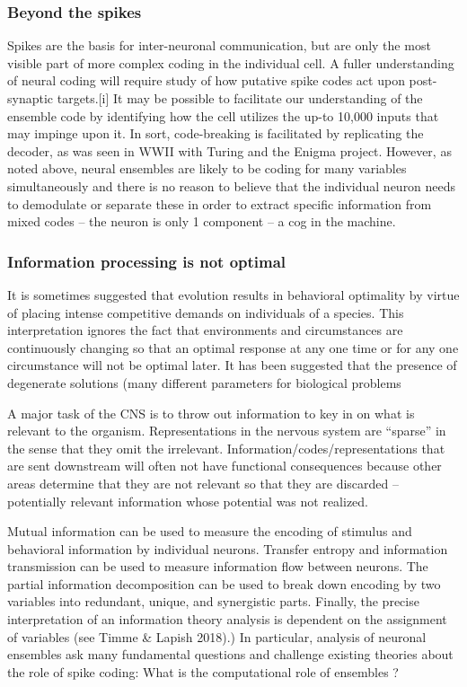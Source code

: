 \documentclass[12pt]{article}
\begin{document}
\subsubsection{ Beyond the spikes}
Spikes are the  basis for inter-neuronal communication, but are only the most visible part of more complex coding in the individual cell.
A fuller understanding of neural coding will require study of how putative spike codes act upon post-synaptic targets.[i]
It may be possible to facilitate our understanding of the ensemble code by identifying how the cell utilizes the up-to 10,000 inputs that may impinge upon it.
In sort, code-breaking is facilitated by replicating the decoder, as was seen in WWII with Turing and the Enigma project.
However, as noted above, neural ensembles are likely to be coding for many variables simultaneously and there is no reason to believe that the individual neuron needs to
demodulate or separate these in order to extract specific information from mixed codes -- the neuron is only 1 component -- a cog in the machine.

\subsubsection{Information processing is not optimal}

It is sometimes suggested that evolution results in behavioral optimality by virtue of placing intense competitive demands on individuals of a species. This interpretation
ignores the fact that environments and circumstances are continuously changing so that an optimal response at any one time or for any one circumstance will not be optimal
later. It has been suggested that the presence of degenerate solutions (many different parameters for biological problems

A major task of the CNS is to throw out information to key in on what is relevant to the organism. Representations in the nervous system are “sparse” in the sense that they
omit the irrelevant. Information/codes/representations that are sent downstream will often not have functional consequences because other areas determine that they are not
relevant so that they are discarded -- potentially relevant information whose potential was not realized.

Mutual information can be used to measure the encoding of stimulus and behavioral information by individual neurons. Transfer entropy and information transmission can be used
to measure information flow between neurons. The partial information decomposition can be used to break down encoding by two variables into redundant, unique, and synergistic
parts. Finally, the precise interpretation of an information theory analysis is dependent on the assignment of variables (see Timme \& Lapish 2018).)
In particular, analysis of neuronal ensembles ask many fundamental questions and challenge existing theories about the role of spike coding:
What is the computational role of ensembles ?
\end{document}
